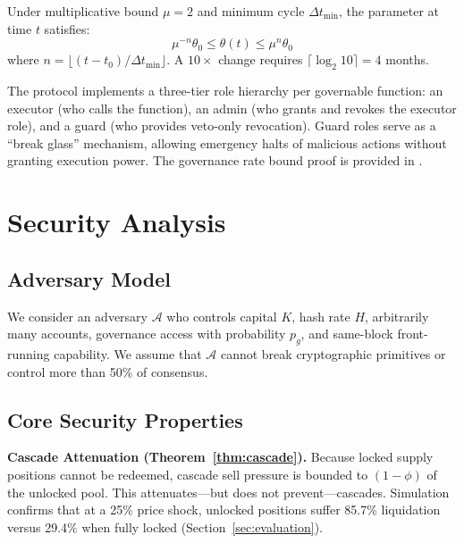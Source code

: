 \documentclass[10pt,a4paper,twocolumn]{article}
\begin{document}
\begin{theorem}
\label{thm:governance}
Under multiplicative bound $\mu = 2$ and minimum cycle $\Delta t_{\min}$, the parameter at time $t$ satisfies:
\begin{equation}
\mu^{-n} \theta_0 \leq \theta(t) \leq \mu^n \theta_0
\end{equation}
where $n = \lfloor(t{-}t_0)/\Delta t_{\min}\rfloor$. A $10\times$ change requires $\lceil\log_2 10\rceil = 4$ months.
\end{theorem}

The protocol implements a three-tier role hierarchy per governable function: an executor (who calls the function), an admin (who grants and revokes the executor role), and a guard (who provides veto-only revocation). Guard roles serve as a ``break glass'' mechanism, allowing emergency halts of malicious actions without granting execution power. The governance rate bound proof is provided in \cite{mtp}.

\section{Security Analysis}
\label{sec:security}

\subsection{Adversary Model}

We consider an adversary $\mathcal{A}$ who controls capital $K$, hash rate $H$, arbitrarily many accounts, governance access with probability $p_g$, and same-block front-running capability. We assume that $\mathcal{A}$ cannot break cryptographic primitives or control more than 50\% of consensus.

\subsection{Core Security Properties}

\textbf{Cascade Attenuation (Theorem~\ref{thm:cascade}).} Because locked supply positions cannot be redeemed, cascade sell pressure is bounded to $(1{-}\phi)$ of the unlocked pool. This attenuates---but does not prevent---cascades. Simulation confirms that at a 25\% price shock, unlocked positions suffer 85.7\% liquidation versus 29.4\% when fully locked (Section~\ref{sec:evaluation}).
\end{document}
